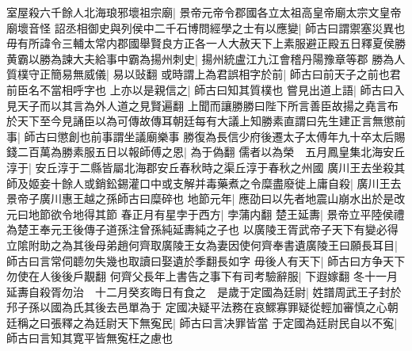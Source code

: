 室屋殺六千餘人北海琅邪壞祖宗廟|{
	景帝元帝令郡國各立太祖高皇帝廟太宗文皇帝廟壞音怪}
詔丞相御史與列侯中二千石博問經學之士有以應變|{
	師古曰謂禦塞災異也}
毋有所諱令三輔太常内郡國舉賢良方正各一人大赦天下上素服避正殿五日釋夏侯勝黄霸以勝為諫大夫給事中霸為揚州刺史|{
	揚州統盧江九江會稽丹陽豫章等郡}
勝為人質樸守正簡易無威儀|{
	易以䜴翻}
或時謂上為君誤相字於前|{
	師古曰前天子之前也君前臣名不當相呼字也}
上亦以是親信之|{
	師古曰知其質樸也}
嘗見出道上語|{
	師古曰入見天子而以其言為外人道之見賢遍翻}
上聞而讓勝勝曰陛下所言善臣故揚之堯言布於天下至今見誦臣以為可傳故傳耳朝廷每有大議上知勝素直謂曰先生建正言無懲前事|{
	師古曰懲創也前事謂坐議廟樂事}
勝復為長信少府後遷太子太傅年九十卒太后賜錢二百萬為勝素服五日以報師傅之恩|{
	為于偽翻}
儒者以為榮　五月鳳皇集北海安丘淳于|{
	安丘淳于二縣皆屬北海郡安丘春秋時之渠丘淳于春秋之州國}
廣川王去坐殺其師及姬妾十餘人或銷鈆錫灌口中或支解并毒藥煮之令糜盡廢徙上庸自殺|{
	廣川王去景帝子廣川惠王越之孫師古曰糜碎也}
地節元年|{
	應劭曰以先者地震山崩水出於是改元曰地節欲令地得其節}
春正月有星孛于西方|{
	孛蒲内翻}
楚王延夀|{
	景帝立平陸侯禮為楚王奉元王後傳子道孫注曾孫純延夀純之子也}
以廣陵王胥武帝子天下有變必得立隂附助之為其後母弟趙何齊取廣陵王女為妻因使何齊奉書遺廣陵王曰願長耳目|{
	師古曰言常伺聼勿失幾也取讀曰娶遺於季翻長如字}
毋後人有天下|{
	師古曰方争天下勿使在人後後戶覯翻}
何齊父長年上書告之事下有司考驗辭服|{
	下遐嫁翻}
冬十一月延夀自殺胥勿治　十二月癸亥晦日有食之　是歲于定國為廷尉|{
	姓譜周武王子封於䢴子孫以國為氏其後去邑單為于}
定國决疑平法務在哀鰥寡罪疑從輕加審慎之心朝廷稱之曰張釋之為廷尉天下無寃民|{
	師古曰言决罪皆當}
于定國為廷尉民自以不寃|{
	師古曰言知其寛平皆無寃枉之慮也}


